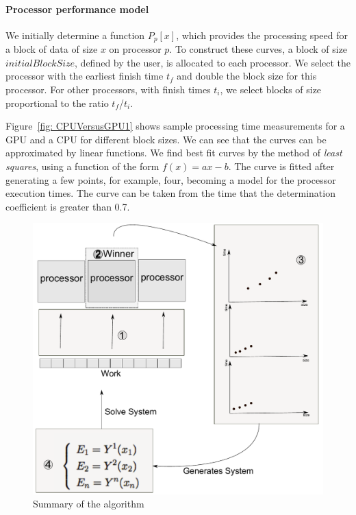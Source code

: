 \documentclass[journal]{IEEEtran}
\begin{document}
\vspace{0.2cm}
\paragraph*{Processor performance model} We initially determine a function
$P_p[x]$, which provides the processing speed for a block of data of size $x$ on
processor $p$. To construct these curves, a block of size $initialBlockSize$,
defined by the user, is allocated to each processor. We select the processor
with the earliest finish time $t_f$ and double the block size for this
processor. For other processors, with finish times $t_i$, we select blocks of
size proportional to the ratio $t_f$/$t_i$.

Figure~\ref{fig: CPUVersusGPU1} shows sample processing time measurements for a
GPU and a CPU for different block sizes. We can see that the curves can be
approximated by linear functions. We find best fit curves by the method of
\textit{least squares}, using a function of the form $f(x) = a x - b$. The
curve is fitted after generating a few points, for example, four, becoming a
model for the processor execution times. The curve can be taken from the time that the determination coefficient is greater than 0.7.


\begin{figure}[!t]
	\centering
			\includegraphics[scale=0.33]{diagramaAlgoritmo.pdf} 				
	\caption{Summary of the algorithm}
	\label{fig: algoritmo}
\end{figure}
\end{document}
